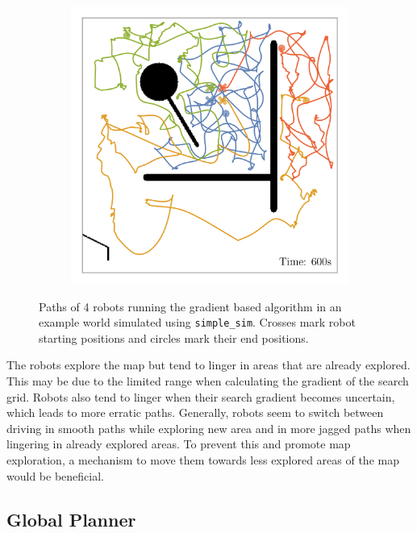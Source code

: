 \begin{figure}[H]
\begin{subfigure}[b]{\w}
    \end{subfigure}
    \begin{subfigure}[b]{\w}
        \centering
        \includegraphics[width=\textwidth]{./figures/plots/paths/search:gradient-paths-(after-600s).png}
    \end{subfigure}
    \caption{Paths of 4 robots running the gradient based algorithm in an example world simulated using \texttt{simple\_sim}. Crosses mark robot starting positions and circles mark their end positions.}
    \label{fig:gradient-paths}
\end{figure}

The robots explore the map but tend to linger in areas that are already explored. 
This may be due to the limited range when calculating the gradient of the search grid. Robots also tend to linger when their search gradient becomes uncertain, which leads to more erratic paths. Generally, robots seem to switch between driving in smooth paths while exploring new area and in more jagged paths when lingering in already explored areas. To prevent this and promote map exploration, a mechanism to move them towards less explored areas of the map would be beneficial.

\subsection{Global Planner}

